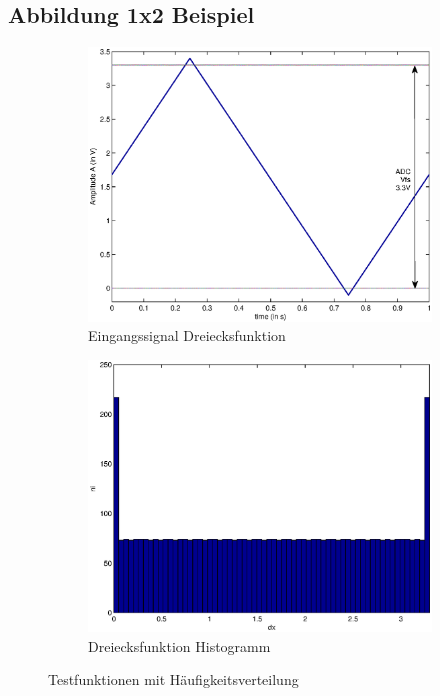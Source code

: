 \documentclass[TGAI_Laborbericht.tex]{subfiles}
\begin{document}
\subsection{Abbildung 1x2 Beispiel}
\begin{figure}[H]
	\begin{subfigure}{.499\textwidth}
		\centering\small
		\includegraphics[width=\textwidth]{media/matlab/HISTOGRAM/ramp_fkt_samples_5000.eps}
		\caption{Eingangssignal Dreiecksfunktion}
		\label{fig:GRUNDL_RAMP_RAMP_1X2}
	\end{subfigure}
	\begin{subfigure}{.499\textwidth}
		\centering\small
		\includegraphics[width=\textwidth]{media/matlab/HISTOGRAM/ramp_hist_samples_5000.eps}
		\caption{Dreiecksfunktion Histogramm}
		\label{fig:GRUNDL_RAMP_HIST_1X2}
	\end{subfigure}
\caption{Testfunktionen mit Häufigkeitsverteilung}
\label{fig:GRUNDL_RAMP_SIN_HIST_1X2}
\end{figure}
\end{document}
